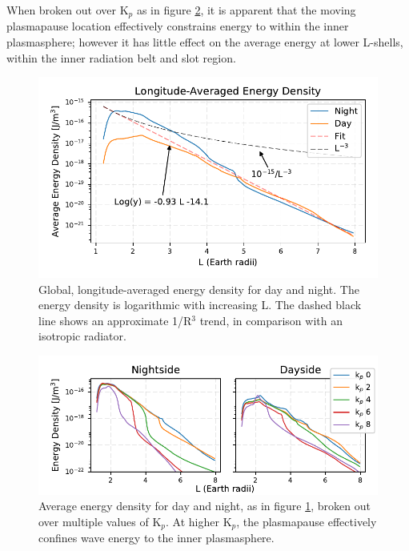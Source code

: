 When broken out over K$_p$ as in figure \ref{fig:energy_density_vs_L_multiple_kp}, it is apparent that the moving plasmapause location effectively constrains energy to within the inner plasmasphere; however it has little effect on the average energy at lower L-shells, within the inner radiation belt and slot region.



\begin{figure}[h!]
\begin{center}
\includegraphics{figures/density_vs_L_with_fit.pdf}
\caption[Average energy density vs L, longitude-averaged]{Global, longitude-averaged energy density for day and night. The energy density is logarithmic with increasing L. The dashed black line shows an approximate 1/R$^3$ trend, in comparison with an isotropic radiator.}
\label{fig:energy_density_vs_L_trendline}
\end{center}
\end{figure}

\begin{figure}[h!]
\begin{center}
\includegraphics{figures/density_vs_L_multiple_kp.pdf}
\caption[Average energy density vs L for multiple K$_p$]{Average energy density for day and night, as in figure \ref{fig:energy_density_vs_L_trendline}, broken out over multiple values of K$_p$. At higher K$_p$, the plasmapause effectively confines wave energy to the inner plasmasphere.}
\label{fig:energy_density_vs_L_multiple_kp}
\end{center}
\end{figure}

